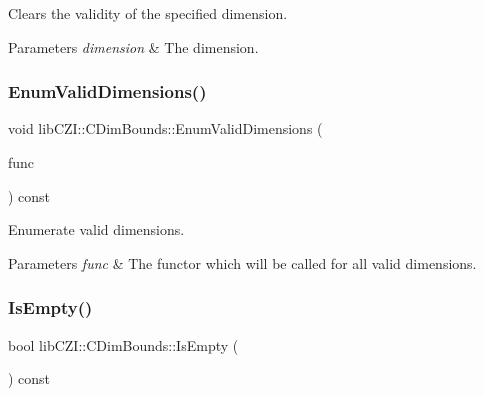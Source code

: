 Clears the validity of the specified dimension. 
\begin{DoxyParams}{Parameters}
{\em dimension} & The dimension. \\
\hline
\end{DoxyParams}
\mbox{\label{classlib_c_z_i_1_1_c_dim_bounds_ae2bddb983e507840449695dc2757cd2f}} 
\subsubsection{\texorpdfstring{Enum\+Valid\+Dimensions()}{EnumValidDimensions()}}
{\footnotesize\ttfamily void lib\+C\+Z\+I\+::\+C\+Dim\+Bounds\+::\+Enum\+Valid\+Dimensions (\begin{DoxyParamCaption}\item[{std\+::function$<$ bool(\hyperlink{namespacelib_c_z_i_a55049658acf59d0eddfaebcad16df424}{lib\+C\+Z\+I\+::\+Dimension\+Index} dim, int start, int size)$>$}]{func }\end{DoxyParamCaption}) const\hspace{0.3cm}{\ttfamily [inline]}}

Enumerate valid dimensions. 
\begin{DoxyParams}{Parameters}
{\em func} & The functor which will be called for all valid dimensions. \\
\hline
\end{DoxyParams}
\mbox{\label{classlib_c_z_i_1_1_c_dim_bounds_a8c72a9198f5b88b1d3d68acdb79758ba}} 
\subsubsection{\texorpdfstring{Is\+Empty()}{IsEmpty()}}
{\footnotesize\ttfamily bool lib\+C\+Z\+I\+::\+C\+Dim\+Bounds\+::\+Is\+Empty (\begin{DoxyParamCaption}{ }\end{DoxyParamCaption}) const\hspace{0.3cm}{\ttfamily [inline]}}

